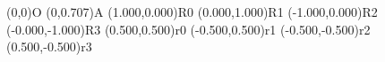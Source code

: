 \pstGeonode(0,0){O}
\pstGeonode(0,0.707){A}
\pstGeonode(1.000,0.000){R0}
\pstGeonode(0.000,1.000){R1}
\pstGeonode(-1.000,0.000){R2}
\pstGeonode(-0.000,-1.000){R3}
\pstGeonode(0.500,0.500){r0}
\pstGeonode(-0.500,0.500){r1}
\pstGeonode(-0.500,-0.500){r2}
\pstGeonode(0.500,-0.500){r3}
